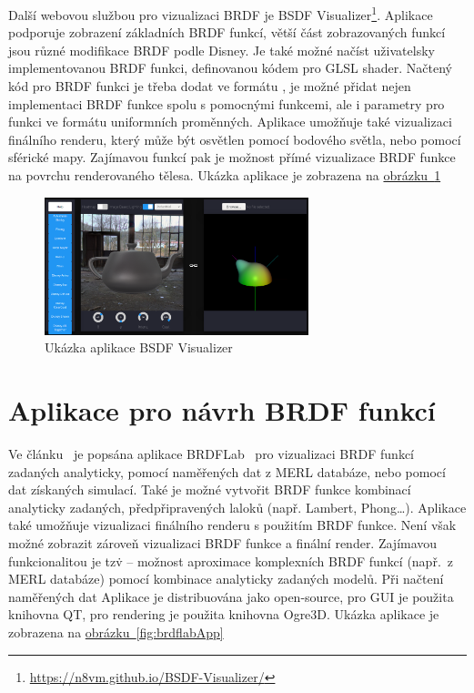 \documentclass[czech,master]{diploma}
\begin{document}
Další webovou službou pro vizualizaci BRDF je BSDF Visualizer\footnote{\url{https://n8vm.github.io/BSDF-Visualizer/}}. Aplikace podporuje zobrazení základních BRDF funkcí, větší část zobrazovaných funkcí jsou různé modifikace BRDF podle Disney. Je také možné načíst uživatelsky implementovanou BRDF funkci, definovanou kódem pro GLSL shader. Načtený kód pro BRDF funkci je třeba dodat ve formátu , je možné přidat nejen implementaci BRDF funkce spolu s pomocnými funkcemi, ale i parametry pro funkci ve formátu uniformních proměnných. Aplikace umožňuje také vizualizaci finálního renderu, který může být osvětlen pomocí bodového světla, nebo pomocí sférické mapy. Zajímavou funkcí pak je možnost přímé vizualizace BRDF funkce na povrchu renderovaného tělesa. Ukázka aplikace je zobrazena na \hyperref[fig:bsdfVizApp]{obrázku~\ref{fig:bsdfVizApp}}

\begin{figure}[ht]
  \centering
  \includegraphics[height=4cm]{Figures/BSDFvisApp.png}
  \caption{Ukázka aplikace BSDF Visualizer}%
  \label{fig:bsdfVizApp}%
\end{figure}

\section{Aplikace pro návrh BRDF funkcí}
Ve článku~\cite{Fors2009BRDFLabAG} je popsána aplikace BRDFLab~\cite{sourceBRDFLab} pro vizualizaci BRDF funkcí zadaných analyticky, pomocí naměřených dat z MERL databáze, nebo pomocí dat získaných simulací. Také je možné vytvořit BRDF funkce kombinací analyticky zadaných, předpřipravených laloků (např. Lambert, Phong\dots). Aplikace také umožňuje vizualizaci finálního renderu s použitím BRDF funkce. Není však možné zobrazit zároveň vizualizaci BRDF funkce a finální render. Zajímavou funkcionalitou je tzv\.  -- možnost aproximace komplexních BRDF funkcí (např.\ z MERL databáze) pomocí kombinace analyticky zadaných modelů. Při načtení naměřených dat Aplikace je distribuována jako open-source, pro GUI je použita knihovna QT, pro rendering je použita knihovna Ogre3D. Ukázka aplikace je zobrazena na \hyperref[fig:brdflabApp]{obrázku~\ref{fig:brdflabApp}}\par
\end{document}
